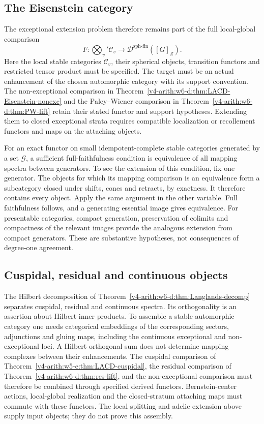 \subsection{The Eisenstein category}
\label{v4-arith:w10-d:cor:LACD-exc}
The exceptional extension problem therefore remains part of the full
local-global comparison
\begin{equation}\label{v4-arith:w10-d:eq:LACD-full}
 F:\bigotimes_v'\mathcal C_v\longrightarrow
                 \mathcal D^{\mathrm{sph\text{-}fin}}([G]_Z).
\end{equation}
Here the local stable categories $\mathcal C_v$, their spherical
objects, transition functors and restricted tensor product must be
specified. The target must be an actual enhancement of the chosen
automorphic category with its support convention.
The non-exceptional comparison in
Theorem~\ref{v4-arith:w6-d:thm:LACD-Eisenstein-nonexc} and the
Paley--Wiener comparison in Theorem~\ref{v4-arith:w6-d:thm:PW-lift}
retain their stated functor and support hypotheses.
Extending them to closed exceptional strata requires compatible
localization or recollement functors and maps on the attaching objects.

For an exact functor on small idempotent-complete stable categories
generated by a set $\mathcal G$, a sufficient full-faithfulness
condition is equivalence of all mapping spectra between generators.
To see the extension of this condition, fix one generator.
The objects for which its mapping comparison is an equivalence form
a subcategory closed under shifts, cones and retracts, by exactness.
It therefore contains every object. Apply the same argument in the
other variable. Full faithfulness follows, and a generating essential
image gives equivalence. For presentable categories, compact generation,
preservation of colimits and compactness of the relevant images provide
the analogous extension from compact generators. These are substantive
hypotheses, not consequences of degree-one agreement.

\subsection{Cuspidal, residual and continuous objects}
\label{v4-arith:w10-d:thm:composite-LACD}
The Hilbert decomposition of
Theorem~\ref{v4-arith:w6-d:thm:Langlands-decomp} separates cuspidal,
residual and continuous spectra. Its orthogonality is an assertion
about Hilbert inner products. To assemble a stable automorphic category
one needs categorical embeddings of the corresponding sectors,
adjunctions and gluing maps, including the continuous exceptional
and non-exceptional loci. A Hilbert orthogonal sum does not determine
mapping complexes between their enhancements.
The cuspidal comparison of
Theorem~\ref{v4-arith:w5-e:thm:LACD-cuspidal}, the residual comparison
of Theorem~\ref{v4-arith:w6-d:thm:res-lift}, and the non-exceptional
comparison must therefore be combined through specified derived
functors. Bernstein-center actions, local-global realization and the
closed-stratum attaching maps must commute with these functors.
The local splitting and adelic extension above supply input objects;
they do not prove this assembly.

